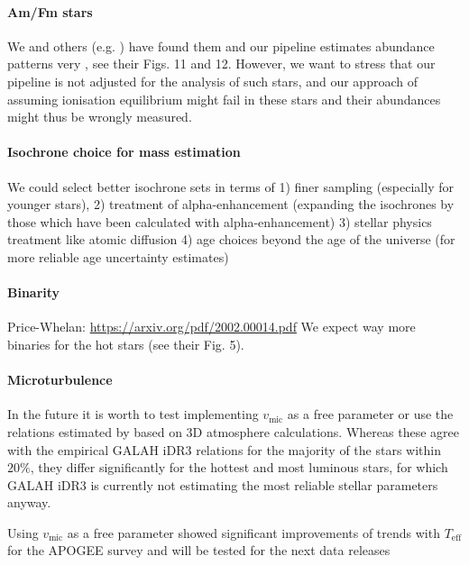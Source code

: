 \documentclass[fleqn,usenatbib,useAMS]{mnras}
\begin{document}
\paragraph*{Am/Fm stars}

We and others (e.g. \citet{Xiang2020}) have found them and our pipeline estimates abundance patterns very \citet{Fossati2008}, see their Figs. 11 and 12.
However, we want to stress that our pipeline is not adjusted for the analysis of such stars, and our approach of assuming ionisation equilibrium might fail in these stars and their abundances might thus be wrongly measured.

\paragraph*{Isochrone choice for mass estimation} We could select better isochrone sets in terms of 1) finer sampling (especially for younger stars), 2) treatment of alpha-enhancement (expanding the isochrones by those which have been calculated with alpha-enhancement) 3) stellar physics treatment like atomic diffusion 4) age choices beyond the age of the universe (for more reliable age uncertainty estimates)

\paragraph*{Binarity}

Price-Whelan: \url{https://arxiv.org/pdf/2002.00014.pdf} We expect way more binaries for the hot stars (see their Fig. 5).

\paragraph*{Microturbulence} In the future it is worth to test implementing $v_\text{mic}$ as a free parameter or use the relations estimated by \citet{DutraFerreira2016} based on 3D atmosphere calculations. Whereas these agree with the empirical GALAH iDR3 relations for the majority of the stars within $20\%$, they differ significantly for the hottest and most luminous stars, for which GALAH iDR3 is currently not estimating the most reliable stellar parameters anyway.

Using $v_\text{mic}$ as a free parameter showed significant improvements of trends with $T_\text{eff}$ for the APOGEE survey \citep{Holtzman2018} and will be tested for the next data releases
\end{document}
